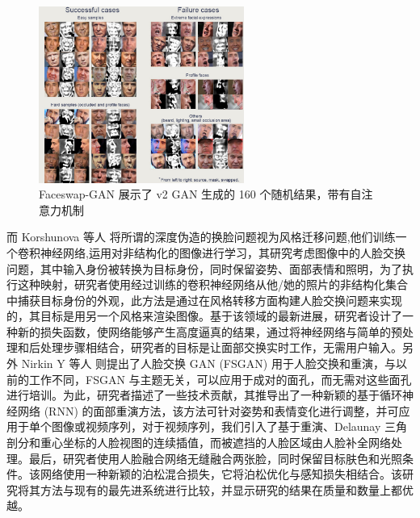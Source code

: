 \begin{figure}[htb]
\centering 
\includegraphics[width=0.60\textwidth]{img/ch1m9.png} 
\caption{Faceswap-GAN 展示了 v2 GAN 生成的 160 个随机结果，带有自注意力机制}
\label{Test}
\end{figure}

而 Korshunova 等人\cite{korshunova2017fast} 将所谓的深度伪造的换脸问题视为风格迁移问题,他们训练一个卷积神经网络,运用对非结构化的图像进行学习，其研究考虑图像中的人脸交换问题，其中输入身份被转换为目标身份，同时保留姿势、面部表情和照明，为了执行这种映射，研究者使用经过训练的卷积神经网络从他/她的照片的非结构化集合中捕获目标身份的外观，此方法是通过在风格转移方面构建人脸交换问题来实现的，其目标是用另一个风格来渲染图像。基于该领域的最新进展，研究者设计了一种新的损失函数，使网络能够产生高度逼真的结果，通过将神经网络与简单的预处理和后处理步骤相结合，研究者的目标是让面部交换实时工作，无需用户输入。另外 Nirkin Y 等人 \cite{nirkin2019fsgan}则提出了人脸交换 GAN (FSGAN) 用于人脸交换和重演，与以前的工作不同，FSGAN 与主题无关，可以应用于成对的面孔，而无需对这些面孔进行培训。为此，研究者描述了一些技术贡献，其推导出了一种新颖的基于循环神经网络 (RNN) 的面部重演方法，该方法可针对姿势和表情变化进行调整，并可应用于单个图像或视频序列，对于视频序列，我们引入了基于重演、Delaunay 三角剖分和重心坐标的人脸视图的连续插值，而被遮挡的人脸区域由人脸补全网络处理。最后，研究者使用人脸融合网络无缝融合两张脸，同时保留目标肤色和光照条件。该网络使用一种新颖的泊松混合损失，它将泊松优化与感知损失相结合。该研究将其方法与现有的最先进系统进行比较，并显示研究的结果在质量和数量上都优越。

